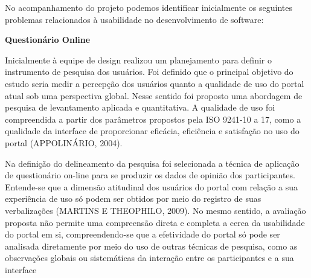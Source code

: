 No acompanhamento do projeto podemos identificar inicialmente os seguintes problemas relacionados à usabilidade no desenvolvimento de software:

\textbf{Questionário Online}

Inicialmente à equipe de design realizou um planejamento para definir o instrumento de pesquisa dos usuários. Foi definido que o principal objetivo do estudo seria medir a percepção dos usuários quanto a qualidade de uso do portal atual sob uma perspectiva global. Nesse sentido foi proposto uma abordagem de pesquisa de levantamento aplicada e quantitativa. A qualidade de uso foi compreendida a partir dos parâmetros propostos pela ISO 9241-10 a 17, como a qualidade da interface de proporcionar eficácia, eficiência e satisfação no uso do portal (APPOLINÁRIO, 2004). 

Na definição do delineamento da pesquisa foi selecionada a técnica de aplicação de questionário on-line para se produzir os dados de opinião dos participantes. Entende-se que a dimensão atitudinal dos usuários do portal com relação a sua experiência de uso só podem ser obtidos por meio do registro de suas verbalizações (MARTINS E THEOPHILO, 2009). No mesmo sentido, a avaliação proposta não permite uma compreensão direta e completa a cerca da usabilidade do portal em si, compreendendo-se que a efetividade do portal só pode ser analisada 
diretamente por meio do uso de outras técnicas de pesquisa, como as observações globais ou sistemáticas da interação entre os participantes e a sua interface %


